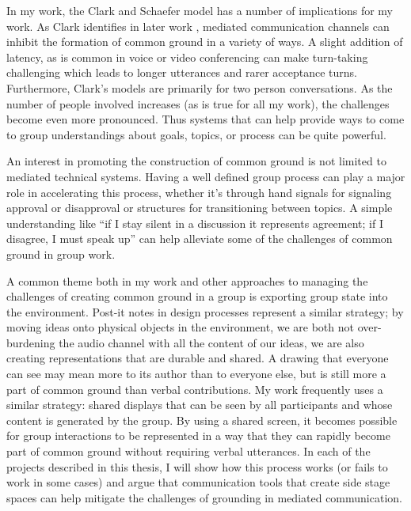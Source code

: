 In my work, the Clark and Schaefer model has a number of implications for my work. As Clark identifies in later work \citep{Brennan:1991wk}, mediated communication channels can inhibit the formation of common ground in a variety of ways. A slight addition of latency, as is common in voice or video conferencing can make turn-taking challenging which leads to longer utterances and rarer acceptance turns. Furthermore, Clark's models are primarily for two person conversations. As the number of people involved increases (as is true for all my work), the challenges become even more pronounced. Thus systems that can help provide ways to come to group understandings about goals, topics, or process can be quite powerful. 

An interest in promoting the construction of common ground is not limited to mediated technical systems. Having a well defined group process can play a major role in accelerating this process, whether it's through hand signals for signaling approval or disapproval or structures for transitioning between topics. A simple understanding like ``if I stay silent in a discussion it represents agreement; if I disagree, I must speak up'' can help alleviate some of the challenges of common ground in group work. 

A common theme both in my work and other approaches to managing the challenges of creating common ground in a group is exporting group state into the environment. Post-it notes in design processes represent a similar strategy; by moving ideas onto physical objects in the environment, we are both not over-burdening the audio channel with all the content of our ideas, we are also creating representations that are durable and shared. A drawing that everyone can see may mean more to its author than to everyone else, but is still more a part of common ground than verbal contributions. My work frequently uses a similar strategy: shared displays that can be seen by all participants and whose content is generated by the group. By using a shared screen, it becomes possible for group interactions to be represented in a way that they can rapidly become part of common ground without requiring verbal utterances. In each of the projects described in this thesis, I will show how this process works (or fails to work in some cases) and argue that communication tools that create side stage spaces can help mitigate the challenges of grounding in mediated communication.





